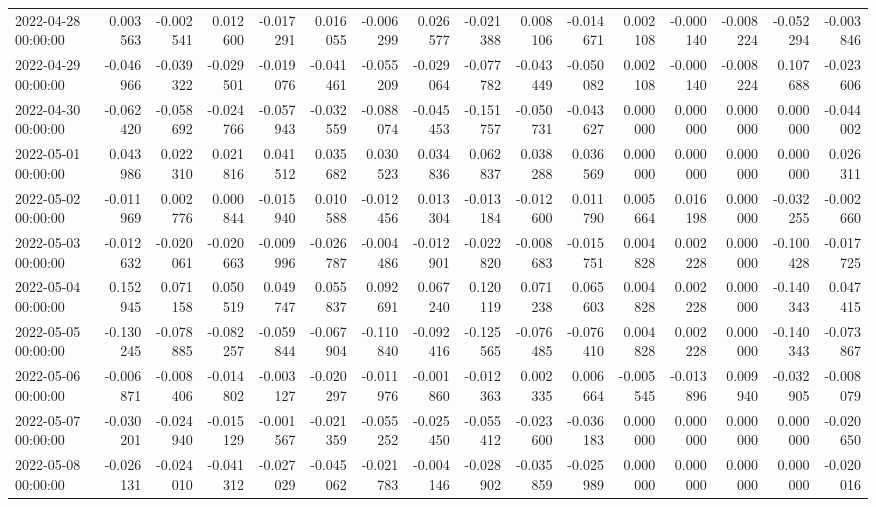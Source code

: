 \begin{tabular}{lrrrrrrrrrrrrrrr}
2022-04-28 00:00:00 & 0.003563 & -0.002541 & 0.012600 & -0.017291 & 0.016055 & -0.006299 & 0.026577 & -0.021388 & 0.008106 & -0.014671 & 0.002108 & -0.000140 & -0.008224 & -0.052294 & -0.003846 \\
2022-04-29 00:00:00 & -0.046966 & -0.039322 & -0.029501 & -0.019076 & -0.041461 & -0.055209 & -0.029064 & -0.077782 & -0.043449 & -0.050082 & 0.002108 & -0.000140 & -0.008224 & 0.107688 & -0.023606 \\
2022-04-30 00:00:00 & -0.062420 & -0.058692 & -0.024766 & -0.057943 & -0.032559 & -0.088074 & -0.045453 & -0.151757 & -0.050731 & -0.043627 & 0.000000 & 0.000000 & 0.000000 & 0.000000 & -0.044002 \\
2022-05-01 00:00:00 & 0.043986 & 0.022310 & 0.021816 & 0.041512 & 0.035682 & 0.030523 & 0.034836 & 0.062837 & 0.038288 & 0.036569 & 0.000000 & 0.000000 & 0.000000 & 0.000000 & 0.026311 \\
2022-05-02 00:00:00 & -0.011969 & 0.002776 & 0.000844 & -0.015940 & 0.010588 & -0.012456 & 0.013304 & -0.013184 & -0.012600 & 0.011790 & 0.005664 & 0.016198 & 0.000000 & -0.032255 & -0.002660 \\
2022-05-03 00:00:00 & -0.012632 & -0.020061 & -0.020663 & -0.009996 & -0.026787 & -0.004486 & -0.012901 & -0.022820 & -0.008683 & -0.015751 & 0.004828 & 0.002228 & 0.000000 & -0.100428 & -0.017725 \\
2022-05-04 00:00:00 & 0.152945 & 0.071158 & 0.050519 & 0.049747 & 0.055837 & 0.092691 & 0.067240 & 0.120119 & 0.071238 & 0.065603 & 0.004828 & 0.002228 & 0.000000 & -0.140343 & 0.047415 \\
2022-05-05 00:00:00 & -0.130245 & -0.078885 & -0.082257 & -0.059844 & -0.067904 & -0.110840 & -0.092416 & -0.125565 & -0.076485 & -0.076410 & 0.004828 & 0.002228 & 0.000000 & -0.140343 & -0.073867 \\
2022-05-06 00:00:00 & -0.006871 & -0.008406 & -0.014802 & -0.003127 & -0.020297 & -0.011976 & -0.001860 & -0.012363 & 0.002335 & 0.006664 & -0.005545 & -0.013896 & 0.009940 & -0.032905 & -0.008079 \\
2022-05-07 00:00:00 & -0.030201 & -0.024940 & -0.015129 & -0.001567 & -0.021359 & -0.055252 & -0.025450 & -0.055412 & -0.023600 & -0.036183 & 0.000000 & 0.000000 & 0.000000 & 0.000000 & -0.020650 \\
2022-05-08 00:00:00 & -0.026131 & -0.024010 & -0.041312 & -0.027029 & -0.045062 & -0.021783 & -0.004146 & -0.028902 & -0.035859 & -0.025989 & 0.000000 & 0.000000 & 0.000000 & 0.000000 & -0.020016 \\

\end{tabular}
